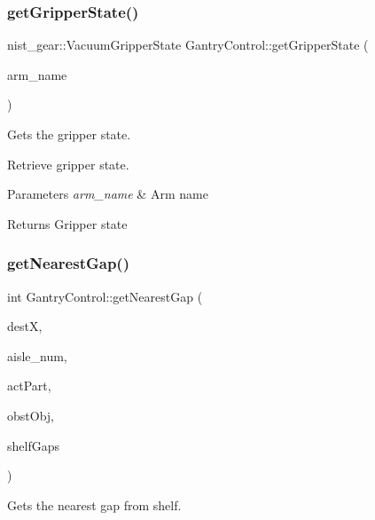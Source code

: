 \subsubsection{\texorpdfstring{get\+Gripper\+State()}{getGripperState()}}
{\footnotesize\ttfamily nist\+\_\+gear\+::\+Vacuum\+Gripper\+State Gantry\+Control\+::get\+Gripper\+State (\begin{DoxyParamCaption}\item[{std\+::string}]{arm\+\_\+name }\end{DoxyParamCaption})}



Gets the gripper state. 

Retrieve gripper state.


\begin{DoxyParams}{Parameters}
{\em arm\+\_\+name} & Arm name \\
\hline
\end{DoxyParams}
\begin{DoxyReturn}{Returns}
Gripper state 
\end{DoxyReturn}
\mbox{\label{classGantryControl_a8a2c57ab3052064c28d1149cee366733}} 
\subsubsection{\texorpdfstring{get\+Nearest\+Gap()}{getNearestGap()}}
{\footnotesize\ttfamily int Gantry\+Control\+::get\+Nearest\+Gap (\begin{DoxyParamCaption}\item[{float}]{destX,  }\item[{int}]{aisle\+\_\+num,  }\item[{int}]{act\+Part,  }\item[{\hyperlink{classObstaclesInAisle}{Obstacles\+In\+Aisle} \&}]{obst\+Obj,  }\item[{const std\+::vector$<$ std\+::pair$<$ float, float $>$ $>$ \&}]{shelf\+Gaps }\end{DoxyParamCaption})}



Gets the nearest gap from shelf. 


